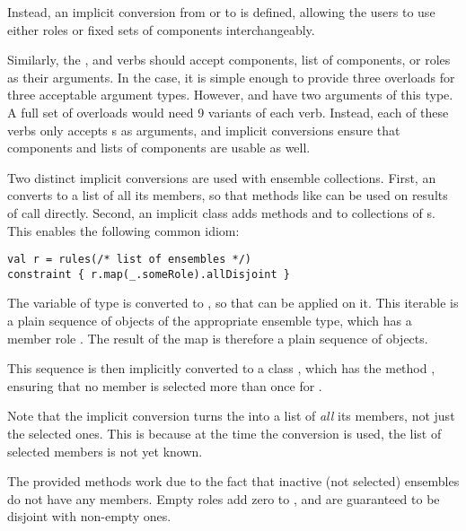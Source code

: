 Instead, an implicit conversion from  or  to
 is defined, allowing the users to use either roles or fixed
sets of components interchangeably.

Similarly, the ,  and  verbs should accept components,
list of components, or roles as their arguments. In the  case, it is simple
enough to provide three overloads for three acceptable argument types. However,
 and  have two arguments of this type. A full set of overloads would
need 9 variants of each verb. Instead, each of these verbs only accepts
s as arguments, and implicit conversions ensure that components and
lists of components are usable as well.

\medskip

Two distinct implicit conversions are used with ensemble collections. First, an
 converts to a list of all its members, so that methods like 
can be used on results of  call directly. Second, an implicit class
 adds methods  and  to
collections of s. This enables the following common idiom:
\begin{lstlisting}[style=snippet]
val r = rules(/* list of ensembles */)
constraint { r.map(_.someRole).allDisjoint }
\end{lstlisting}
\noindent
The variable  of type  is converted to , so that  can be applied on it. This iterable is a plain sequence of
objects of the appropriate ensemble type, which has a member role . The
result of the map is therefore a plain sequence of  objects.

This sequence is then implicitly converted to a class , which
has the method , ensuring that no member is selected more than once for
.

Note that the implicit conversion turns the  into a list of
\textit{all} its members, not just the selected ones. This is because at the time the
conversion is used, the list of selected members is not yet known.

The provided methods work due to the fact that inactive (not selected) ensembles do not
have any members. Empty roles add zero to , and are guaranteed to be
disjoint with non-empty ones.

